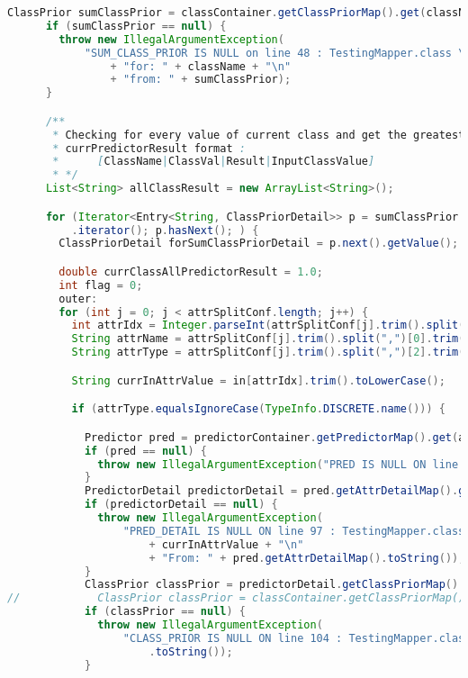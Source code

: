 \begin{lstlisting}[language=Java,basicstyle=\tiny,caption=TestingMapper.java]
      ClassPrior sumClassPrior = classContainer.getClassPriorMap().get(className);
      if (sumClassPrior == null) {
        throw new IllegalArgumentException(
            "SUM_CLASS_PRIOR IS NULL on line 48 : TestingMapper.class \n"
                + "for: " + className + "\n"
                + "from: " + sumClassPrior);
      }

      /**
       * Checking for every value of current class and get the greatest
       * currPredictorResult format :
       *      [ClassName|ClassVal|Result|InputClassValue]
       * */
      List<String> allClassResult = new ArrayList<String>();

      for (Iterator<Entry<String, ClassPriorDetail>> p = sumClassPrior.getAttrDetailMap().entrySet()
          .iterator(); p.hasNext(); ) {
        ClassPriorDetail forSumClassPriorDetail = p.next().getValue();

        double currClassAllPredictorResult = 1.0;
        int flag = 0;
        outer:
        for (int j = 0; j < attrSplitConf.length; j++) {
          int attrIdx = Integer.parseInt(attrSplitConf[j].trim().split(",")[1]);
          String attrName = attrSplitConf[j].trim().split(",")[0].trim().toLowerCase();
          String attrType = attrSplitConf[j].trim().split(",")[2].trim().toLowerCase();

          String currInAttrValue = in[attrIdx].trim().toLowerCase();

          if (attrType.equalsIgnoreCase(TypeInfo.DISCRETE.name())) {

            Predictor pred = predictorContainer.getPredictorMap().get(attrName);
            if (pred == null) {
              throw new IllegalArgumentException("PRED IS NULL ON line 93 : TestingMapper.class");
            }
            PredictorDetail predictorDetail = pred.getAttrDetailMap().get(currInAttrValue);
            if (predictorDetail == null) {
              throw new IllegalArgumentException(
                  "PRED_DETAIL IS NULL ON line 97 : TestingMapper.class\n For Val="
                      + currInAttrValue + "\n"
                      + "From: " + pred.getAttrDetailMap().toString());
            }
            ClassPrior classPrior = predictorDetail.getClassPriorMap().get(className);
//            ClassPrior classPrior = classContainer.getClassPriorMap().get(className);
            if (classPrior == null) {
              throw new IllegalArgumentException(
                  "CLASS_PRIOR IS NULL ON line 104 : TestingMapper.class" + " => " + predictorDetail
                      .toString());
            }


\end{lstlisting}
